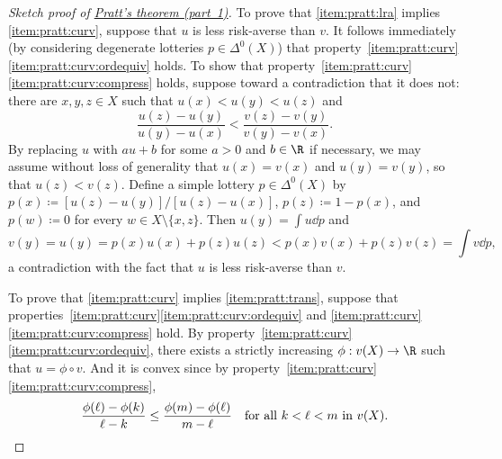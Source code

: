 \begin{proof}[Sketch proof of {\hyperref[theorem:pratt]{Pratt's theorem (part~1)}}]
	To prove that \ref{item:pratt:lra} implies \ref{item:pratt:curv}, suppose that $u$ is less risk-averse than $v$. It follows immediately (by considering degenerate lotteries $p \in \Delta^0(X)$) that property~\ref{item:pratt:curv}\ref{item:pratt:curv:ordequiv} holds.
	To show that property~\ref{item:pratt:curv}\ref{item:pratt:curv:compress} holds, suppose toward a contradiction that it does not: there are $x,y,z \in X$ such that $u(x) < u(y) < u(z)$ and
	\begin{equation*}
		\frac{u(z)-u(y)}{u(y)-u(x)}
		< \frac{v(z)-v(y)}{v(y)-v(x)} .
	\end{equation*}
	By replacing $u$ with $a u + b$ for some $a > 0$ and $b \in \R$ if necessary, we may assume without loss of generality that $u(x) = v(x)$ and $u(y) = v(y)$, so that $u(z) < v(z)$.
	Define a simple lottery $p \in \Delta^0(X)$ by $p(x) \coloneqq [ u(z) - u(y) ] / [ u(z) - u(x) ]$, $p(z) \coloneqq 1-p(x)$, and $p(w) \coloneqq 0$ for every $w \in X \setminus \{x,z\}$.
	Then $u(y) = \int u \dd p$ and
	\begin{equation*}
		v(y)
		= u(y)
		= p(x) u(x) + p(z) u(z)
		< p(x) v(x) + p(z) v(z)
		= \int v \dd p ,
	\end{equation*}
	a contradiction with the fact that $u$ is less risk-averse than $v$.

	To prove that \ref{item:pratt:curv} implies \ref{item:pratt:trans}, suppose that properties~\ref{item:pratt:curv}\ref{item:pratt:curv:ordequiv} and \ref{item:pratt:curv}\ref{item:pratt:curv:compress} hold. By property~\ref{item:pratt:curv}\ref{item:pratt:curv:ordequiv}, there exists a strictly increasing $\phi : v(X) \to \R$ such that $u = \phi \circ v$. And it is convex since by property~\ref{item:pratt:curv}\ref{item:pratt:curv:compress},
	\begin{equation*}
		\frac{\phi(\ell)-\phi(k)}{\ell-k}
		\leq \frac{\phi(m)-\phi(\ell)}{m-\ell}
		\quad \text{for all $k < \ell < m$ in $v(X)$.} \qedhere
	\end{equation*}
\end{proof}


